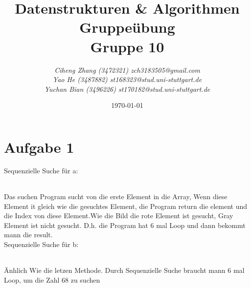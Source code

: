 \documentclass{article}
\begin{document}
\begin{titlepage}
    \title{\Huge \textbf{Datenstrukturen \& Algorithmen Gruppeübung\\Gruppe 10} }
    \author{\LARGE \textsl{Ciheng Zhang (3472321) zch3183505@gmail.com}\\\LARGE \textsl{Yao He (3487882) st168323@stud.uni-stuttgart.de}\\\LARGE \textsl{Yuchan Bian (3496226) st170182@stud.uni-stuttgart.de} \\[200pt]}
    \date{\today}
    \maketitle
    \thispagestyle{empty}
\end{titlepage}
\newpage
\section{Aufgabe 1}
Sequenzielle Suche für a:\\
\\
Das suchen Program sucht von die erste Element in die Array, Wenn diese Element it gleich wie die gesuchtes Element, die Program return die element und die Index von diese Element.Wie die Bild
die rote Element ist gesucht, Gray Element ist nicht gesucht. D.h. die Program hat 6 mal Loop und dann bekommt mann die result.
\\Sequenzielle Suche für b:\\
\\
Änhlich Wie die letzen Methode. Durch Sequenzielle Suche braucht mann 6 mal Loop, um die Zahl 68 zu suchen\\
\end{document}
